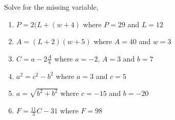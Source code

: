 \documentclass[12pt]{article}
\newenvironment{problem}[2][Problem]{\begin{trivlist}
\item[\hskip \labelsep {\bfseries #1}\hskip \labelsep {\bfseries #2.}]}{\end{trivlist}}
\newenvironment{sol}
    {\emph{Solution:}
    }
    {
    \qed
    }
\begin{document}


\begin{problem}{1}
    Solve for the missing variable,
  \begin{enumerate}[label=\roman*)]
  \item $P = 2(L+(w+4)$ where $P = 29$ and $L = 12$ 
  \item $A = (L+2)(w + 5) $ where $A = 40$ and $w = 3$ 
  \item $C = a-2\frac{A}{b}$ where $a = -2$, $A = 3$ and $b=7$
  \item $a^2 = c^2 - b^2$ where $a = 3$ and $c = 5$
  \item $a =\sqrt{b^2+b^2}$ where $c=-15$ and $b=-20$
  \item $F = \frac{11}{3}C -31$ where $F = 98$
  \end{enumerate}

\end{problem}
\end{document}

